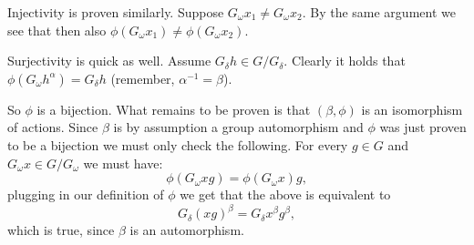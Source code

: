 \documentclass{article}
\begin{document}
Injectivity is proven similarly. Suppose $G_\omega x_1 \neq G_\omega x_2$. By the same argument we see that then also $\phi(G_\omega x_1) \neq \phi(G_\omega x_2)$.

Surjectivity is quick as well. Assume $G_\delta h \in G/G_\delta$. Clearly it holds that $\phi(G_\omega h^{\alpha}) = G_\delta h$ (remember, $\alpha^{-1} = \beta$).

So $\phi$ is a bijection. What remains to be proven is that $(\beta, \phi)$ is an isomorphism of actions. Since $\beta$ is by assumption a group automorphism and $\phi$ was just proven to be a bijection we must only check the following.
For every $g \in G$ and $G_\omega x \in G/G_\omega$ we must have:
\begin{equation*}
\phi(G_\omega x g) = \phi(G_\omega x) g,
\end{equation*}
plugging in our definition of $\phi$ we get that the above is equivalent to
\begin{equation*}
G_\delta (xg)^\beta = G_\delta x^\beta g^\beta,
\end{equation*}
which is true, since $\beta$ is an automorphism.
\end{document}

